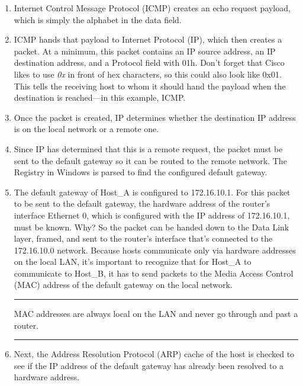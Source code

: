 \begin{enumerate}
\item
  Internet Control Message Protocol (ICMP) creates an echo request
  payload, which is simply the alphabet in the data field.
\item
  ICMP hands that payload to Internet Protocol (IP), which then creates
  a packet. At a minimum, this packet contains an IP source address, an
  IP destination address, and a Protocol field with 01h. Don't forget
  that Cisco likes to use \emph{0x} in front of hex characters, so this
  could also look like 0x01. This tells the receiving host to whom it
  should hand the payload when the destination is reached---in this
  example, ICMP.
\item
  Once the packet is created, IP determines whether the destination IP
  address is on the local network or a remote one.
\item
  Since IP has determined that this is a remote request, the packet must
  be sent to the default gateway so it can be routed to the remote
  network. The Registry in Windows is parsed to find the configured
  default gateway.
\item
  The default gateway of Host\_A is configured to 172.16.10.1. For this
  packet to be sent to the default gateway, the hardware address of the
  router's interface Ethernet 0, which is configured with the IP address
  of 172.16.10.1, must be known. Why? So the packet can be handed down
  to the Data Link layer, framed, and sent to the router's interface
  that's connected to the 172.16.10.0 network. Because hosts communicate
  only via hardware addresses on the local LAN, it's important to
  recognize that for Host\_A to communicate to Host\_B, it has to send
  packets to the Media Access Control (MAC) address of the default
  gateway on the local network.

  \begin{center}\rule{0.5\linewidth}{0.5pt}\end{center}

   MAC addresses are always local on
  the LAN and never go through and past a router.

  \begin{center}\rule{0.5\linewidth}{0.5pt}\end{center}
\item
  Next, the Address Resolution Protocol (ARP) cache of the host is
  checked to see if the IP address of the default gateway has already
  been resolved to a hardware address.


\end{enumerate}
